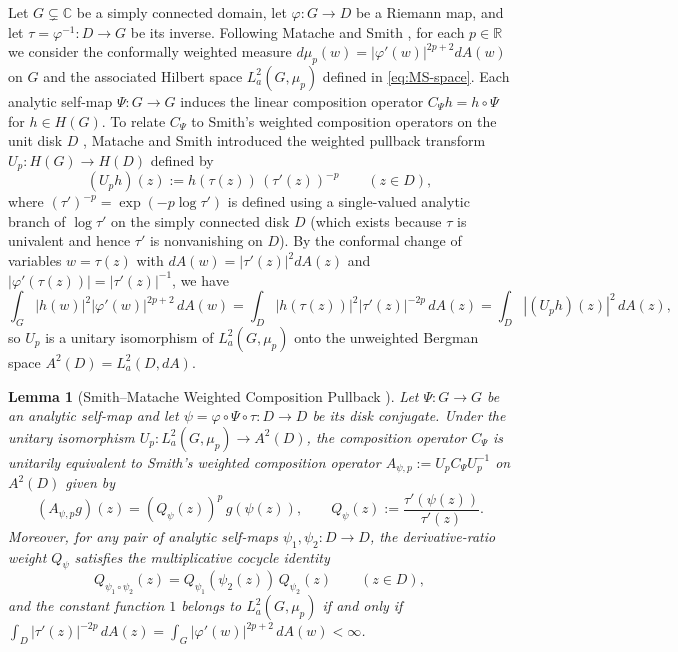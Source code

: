 \documentclass[12pt]{article}
\def\R{\mathbb{R}}
\def\C{\mathbb{C}}
\newtheorem{lemma}[thm]{Lemma}
\theoremstyle{definition}
\numberwithin{equation}{section}
\begin{document}
Let $G \subsetneq \C$ be a simply connected domain, let $\varphi : G \to D$ be a Riemann map, and let $\tau = \varphi^{-1} : D \to G$ be its inverse. Following Matache and Smith \cite[Section~2]{MS12}, for each $p \in \R$ we consider the conformally weighted measure $d\mu_p(w) = |\varphi'(w)|^{2p+2} dA(w)$ on $G$ and the associated Hilbert space $L^2_a(G, \mu_p)$ defined in \eqref{eq:MS-space}. Each analytic self-map $\Psi : G \to G$ induces the linear composition operator $C_\Psi h = h \circ \Psi$ for $h \in H(G)$. To relate $C_\Psi$ to Smith's weighted composition operators on the unit disk $D$ \cite{Smi06}, Matache and Smith \cite[Section~2]{MS12} introduced the weighted pullback transform $U_p : H(G) \to H(D)$ defined by
\begin{equation}\label{eq:Up-def}
  (U_p h)(z) := h(\tau(z))\, (\tau'(z))^{-p} \qquad (z \in D),
\end{equation}
where $(\tau')^{-p} = \exp(-p \log \tau')$ is defined using a single-valued analytic branch of $\log \tau'$ on the simply connected disk $D$ (which exists because $\tau$ is univalent and hence $\tau'$ is nonvanishing on $D$). By the conformal change of variables $w = \tau(z)$ with $dA(w) = |\tau'(z)|^2 dA(z)$ and $|\varphi'(\tau(z))| = |\tau'(z)|^{-1}$, we have
\[
  \int_G |h(w)|^2 |\varphi'(w)|^{2p+2} \, dA(w) = \int_D |h(\tau(z))|^2 |\tau'(z)|^{-2p} \, dA(z) = \int_D |(U_p h)(z)|^2 \, dA(z),
\]
so $U_p$ is a unitary isomorphism of $L^2_a(G, \mu_p)$ onto the unweighted Bergman space $A^2(D) = L^2_a(D, dA)$.

\begin{lemma}[Smith--Matache Weighted Composition Pullback \cite{Smi06, MS12}]\label{lem:smith-pullback}
Let $\Psi : G \to G$ be an analytic self-map and let $\psi = \varphi \circ \Psi \circ \tau : D \to D$ be its disk conjugate. Under the unitary isomorphism $U_p : L^2_a(G, \mu_p) \to A^2(D)$, the composition operator $C_\Psi$ is unitarily equivalent to Smith's weighted composition operator $A_{\psi, p} := U_p C_\Psi U_p^{-1}$ on $A^2(D)$ given by
\begin{equation}\label{eq:smith-wco}
  (A_{\psi, p} g)(z) = (Q_\psi(z))^{p} \, g(\psi(z)), \qquad Q_\psi(z) := \frac{\tau'(\psi(z))}{\tau'(z)}.
\end{equation}
Moreover, for any pair of analytic self-maps $\psi_1, \psi_2 : D \to D$, the derivative-ratio weight $Q_\psi$ satisfies the multiplicative cocycle identity
\begin{equation}\label{eq:smith-cocycle-lemma}
  Q_{\psi_1 \circ \psi_2}(z) = Q_{\psi_1}(\psi_2(z)) \, Q_{\psi_2}(z) \qquad (z \in D),
\end{equation}
and the constant function $1$ belongs to $L^2_a(G, \mu_p)$ if and only if $\int_D |\tau'(z)|^{-2p} \, dA(z) = \int_G |\varphi'(w)|^{2p+2} \, dA(w) < \infty$.
\end{lemma}
\end{document}
